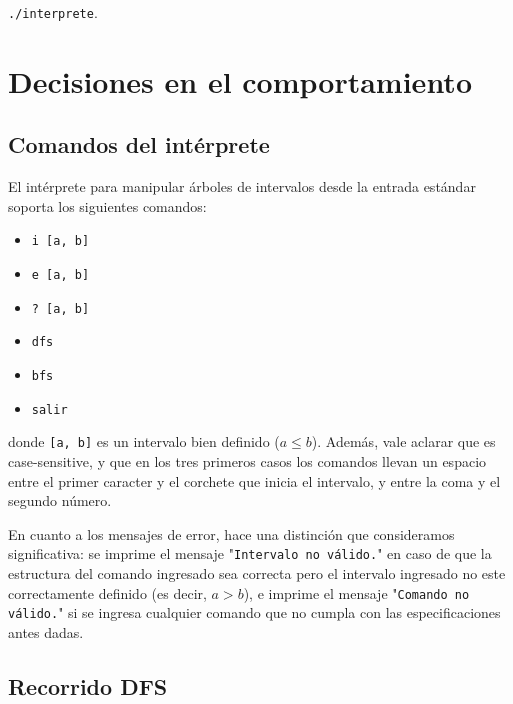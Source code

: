 \documentclass[11pt]{article}
\begin{document}
 \noindent \verb|./interprete|. \par
 
 
 \section{Decisiones en el comportamiento}
 
 \subsection{Comandos del intérprete}
 
 El intérprete para manipular árboles de intervalos desde la entrada estándar soporta los siguientes comandos:
 
 \vspace{-0.5cm}
 \begin{itemize}
     \item \verb|i [a, b]|
     \vspace{-0.3cm}
     \item \verb|e [a, b]|
     \vspace{-0.3cm}
     \item \verb|? [a, b]|
     \vspace{-0.3cm}
     \item \verb|dfs|
     \vspace{-0.3cm}
     \item \verb|bfs|
     \vspace{-0.3cm}
     \item \verb|salir|
 \end{itemize}
 \vspace{-0.5cm}
 
 
 \noindent donde \verb|[a, b]| es un intervalo bien definido ($a \le b$).
 Además, vale aclarar que es case-sensitive, y que en los tres primeros casos los comandos llevan un espacio entre el primer caracter y el corchete que inicia el intervalo, y entre la coma y el segundo número. \par
 
 En cuanto a los mensajes de error, hace una distinción que consideramos significativa: se imprime el mensaje "\verb|Intervalo no válido.|" en caso de que la estructura del comando ingresado sea correcta pero el intervalo ingresado no este correctamente definido (es decir, $a > b$), e imprime el mensaje "\verb|Comando no válido.|" si se ingresa cualquier comando que no cumpla con las especificaciones antes dadas. \par
 
 \subsection{Recorrido DFS}
 
\end{document}
